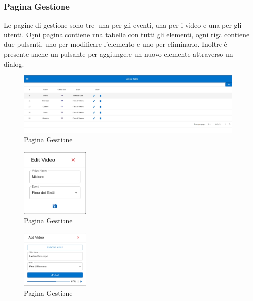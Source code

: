 \subsubsection{Pagina Gestione}
Le pagine di gestione sono tre, una per gli eventi, una per i video e una per gli utenti. Ogni pagina contiene una tabella con tutti gli elementi, ogni riga contiene due pulsanti, uno per modificare l'elemento e uno per eliminarlo. Inoltre è presente anche un pulsante per aggiungere un nuovo elemento attraverso un dialog.\\
\begin{figure}[H]
    \centering
    \includegraphics[width=1\textwidth]{images/interface/videotable.png}
    \caption{Pagina Gestione}
    \label{fig:gestione}
\end{figure}
\begin{figure}[H]
    \centering
    \includegraphics[width=0.3\textwidth]{images/interface/editvideo.png}
    \caption{Pagina Gestione}
    \label{fig:gestione2}
\end{figure}
\begin{figure}[H]
    \centering
    \includegraphics[width=0.3\textwidth]{images/interface/addvideo.png}
    \caption{Pagina Gestione}
    \label{fig:gestione3}
\end{figure}
